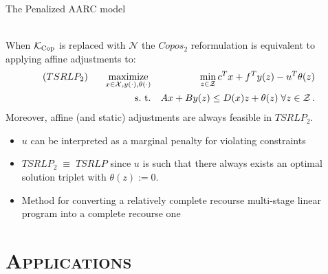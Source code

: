 \documentclass[xcolor=x11names,compress]{beamer}
\renewcommand{\(}{\begin{columns}}
\renewcommand{\)}{\end{columns}}
\newcommand{\<}[1]{\begin{column}{#1}}
\renewcommand{\>}{\end{column}}
\def\maximize{\mathop{\rm maximize}}
\def\subto{{\rm s. \mbox{ }\rm t.}}
\def\min{\mathop{\rm min}}
\newcommand{\X}{\mathcal{X}}
\newcommand{\0}{\V{0}}
\newcommand{\1}{\V{1}}
\newcommand{\mymbox}[1]{\mbox{\scriptsize #1}}
\newcommand{\Z}{\mathcal{Z}}
\newcommand{\N}{\mathcal{N}}
\newcommand{\copconeCopos}{\mathcal{K}_{\mymbox{Cop}}}
\begin{document}

\begin{frame}{The Penalized AARC model}

\begin{theorem}
\vspace{-0.5cm}\hspace{2.5cm}{\footnotesize [revised AJ\&D (2016b)]}\\
When  $\copconeCopos$ is replaced with $\N$ the $Copos_2$ reformulation is equivalent to applying affine adjustments to:
\begin{eqnarray*}
(TSRLP_2) \;\;\;\;\;\;\maximize_{x\in\X,y(\cdot),\theta(\cdot)}&&\min_{z\in\Z} c^Tx+f^Ty(z)-u^T\theta(z)\\
\subto &&Ax+By(z)\le D(x) z+\theta(z)\;\forall z\in\Z\,.
\end{eqnarray*}
Moreover, affine (and static) adjustments are always feasible in $TSRLP_2$.
\end{theorem}

\begin{itemize}
\pause\item $u$ can be interpreted as a marginal penalty for violating constraints
\pause\item $TSRLP_2 \;\equiv\; TSRLP$ since $u$ is such that there always exists an optimal solution triplet with $\theta(z):=0$.
\pause\item Method for converting a relatively complete recourse multi-stage linear program into a complete recourse one
\end{itemize}
\end{frame}


\section[Applications]{\scshape Applications}
\subsection[ ]{\scshape  }


\end{document}
